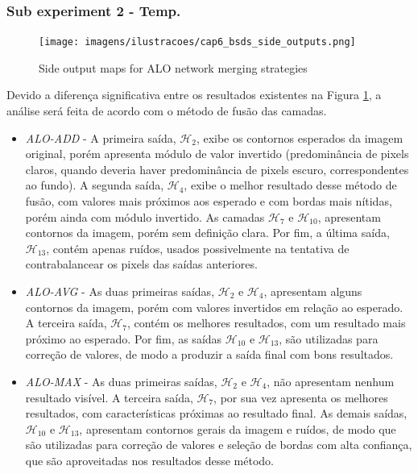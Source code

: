 \subsubsection{Sub experiment 2 - Temp.}
\label{ssec:bsds_subexp2}

\begin{figure}[h!]
  \centering
  \texttt{[image: imagens/ilustracoes/cap6\_bsds\_side\_outputs.png]}
  \caption{Side output maps for ALO network merging strategies}
  \label{fig:bsds_expr_basic_side_outputs}
\end{figure}

Devido a diferença significativa entre os resultados existentes na Figura \ref{fig:bsds_expr_basic_side_outputs}, a análise será feita de acordo com o método de fusão das camadas.
\begin{itemize}
 \item \textit{ALO-ADD} - A primeira saída, $\mathcal{H}_{2}$, exibe os contornos esperados da imagem original, porém apresenta módulo de valor invertido (predominância de pixels claros, quando deveria haver predominância de pixels escuro, correspondentes ao fundo). A segunda saída, $\mathcal{H}_{4}$, exibe o melhor resultado desse método de fusão, com valores mais próximos aos esperado e com bordas mais nítidas, porém ainda com módulo invertido. As camadas $\mathcal{H}_{7}$ e $\mathcal{H}_{10}$, apresentam contornos da imagem, porém sem definição clara. Por fim, a última saída, $\mathcal{H}_{13}$, contém apenas ruídos, usados possivelmente na tentativa de contrabalancear os pixels das saídas anteriores.
 \item \textit{ALO-AVG} - As duas primeiras saídas, $\mathcal{H}_{2}$ e $\mathcal{H}_{4}$, apresentam alguns contornos da imagem, porém com valores invertidos em relação ao esperado. A terceira saída, $\mathcal{H}_{7}$, contém os melhores resultados, com um resultado mais próximo ao esperado. Por fim, as saídas $\mathcal{H}_{10}$ e $\mathcal{H}_{13}$, são utilizadas para correção de valores, de modo a produzir a saída final com bons resultados.
 \item \textit{ALO-MAX} - As duas primeiras saídas, $\mathcal{H}_{2}$ e $\mathcal{H}_{4}$, não apresentam nenhum resultado visível. A terceira saída, $\mathcal{H}_{7}$, por sua vez apresenta os melhores resultados, com características próximas ao resultado final. As demais saídas, $\mathcal{H}_{10}$ e $\mathcal{H}_{13}$, apresentam contornos gerais da imagem e ruídos, de modo que são utilizadas para correção de valores e seleção de bordas com alta confiança, que são aproveitadas nos resultados desse método.
\end{itemize}

